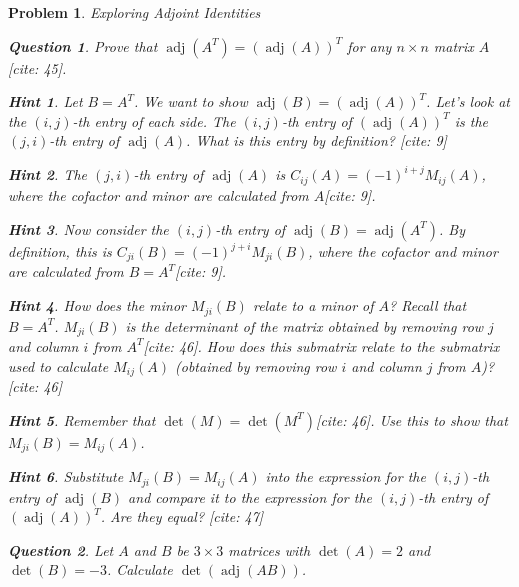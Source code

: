\documentclass[12pt]{article}
\newtheorem{problem}{Problem}[section]
\newtheorem{question}{Question}[problem]
\theoremstyle{definition}
\newtheorem{hint}{Hint}[question]
\newcommand{\adj}{\operatorname{adj}}
\newcommand{\detm}{\operatorname{det}}
\begin{document}
\begin{problem}{Exploring Adjoint Identities}
    \begin{question}
        Prove that $\adj(A^T) = (\adj(A))^T$ for any $n \times n$ matrix $A$[cite: 45].
    \end{question}
    
        \begin{hint}
            Let $B = A^T$. We want to show $\adj(B) = (\adj(A))^T$. Let's look at the $(i, j)$-th entry of each side. The $(i, j)$-th entry of $(\adj(A))^T$ is the $(j, i)$-th entry of $\adj(A)$. What is this entry by definition? [cite: 9]
        \end{hint}
        \begin{hint}
            The $(j, i)$-th entry of $\adj(A)$ is $C_{ij}(A) = (-1)^{i+j} M_{ij}(A)$, where the cofactor and minor are calculated from $A$[cite: 9].
        \end{hint}
        \begin{hint}
            Now consider the $(i, j)$-th entry of $\adj(B) = \adj(A^T)$. By definition, this is $C_{ji}(B) = (-1)^{j+i} M_{ji}(B)$, where the cofactor and minor are calculated from $B=A^T$[cite: 9].
        \end{hint}
        \begin{hint}
            How does the minor $M_{ji}(B)$ relate to a minor of $A$? Recall that $B=A^T$. $M_{ji}(B)$ is the determinant of the matrix obtained by removing row $j$ and column $i$ from $A^T$[cite: 46]. How does this submatrix relate to the submatrix used to calculate $M_{ij}(A)$ (obtained by removing row $i$ and column $j$ from $A$)? [cite: 46]
        \end{hint}
        \begin{hint}
            Remember that $\detm(M) = \detm(M^T)$[cite: 46]. Use this to show that $M_{ji}(B) = M_{ij}(A)$.
        \end{hint}
        \begin{hint}
            Substitute $M_{ji}(B) = M_{ij}(A)$ into the expression for the $(i, j)$-th entry of $\adj(B)$ and compare it to the expression for the $(i, j)$-th entry of $(\adj(A))^T$. Are they equal? [cite: 47]
        \end{hint}
    

    \begin{question}
        Let $A$ and $B$ be $3 \times 3$ matrices with $\detm(A) = 2$ and $\detm(B) = -3$. Calculate $\detm(\adj(AB))$.
    \end{question}
    

\end{problem}
\end{document}
